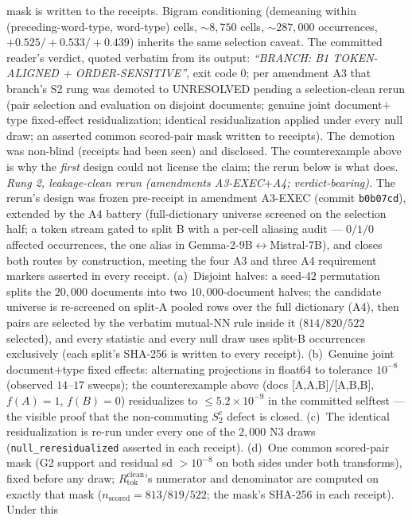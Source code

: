 mask is written to the receipts. Bigram conditioning (demeaning within
(preceding-word-type, word-type) cells, ${\sim}8{,}750$ cells, ${\sim}287{,}000$
occurrences, $+0.525/+0.533/+0.439$) inherits the same selection caveat. The committed
reader's verdict, quoted verbatim from its output: \emph{``BRANCH: B1 TOKEN-ALIGNED +
ORDER-SENSITIVE''}, exit code $0$; per amendment A3 that branch's S2 rung was demoted to
UNRESOLVED pending a selection-clean rerun (pair selection and evaluation on disjoint
documents; genuine joint document$+$type fixed-effect residualization; identical
residualization applied under every null draw; an asserted common scored-pair mask
written to receipts). The demotion was non-blind (receipts had been seen) and disclosed.
The counterexample above is why the \emph{first} design could not license the claim; the
rerun below is what does.
\emph{Rung 2, leakage-clean rerun (amendments A3-EXEC$+$A4; verdict-bearing).} The
rerun's design was frozen pre-receipt in amendment A3-EXEC (commit \texttt{b0b07cd}),
extended by the A4 battery (full-dictionary universe screened on the selection half; a
token stream gated to split B with a per-cell aliasing audit --- $0/1/0$ affected
occurrences, the one alias in Gemma-2-9B$\leftrightarrow$Mistral-7B), and closes
both routes by construction, meeting the four A3 and three A4 requirement markers
asserted in every receipt. (a)~Disjoint halves: a
seed-$42$ permutation splits the $20{,}000$ documents into two $10{,}000$-document
halves; the candidate universe is re-screened on split-A pooled rows over the full
dictionary (A4), then pairs are selected by the verbatim mutual-NN rule inside it
($814/820/522$ selected), and every statistic
and every null draw uses split-B occurrences exclusively (each split's SHA-256 is written
to every receipt). (b)~Genuine joint document$+$type fixed effects: alternating
projections in float64 to tolerance $10^{-8}$ (observed $14$--$17$ sweeps); the
counterexample above (docs [A,A,B]/[A,B,B], $f(A){=}1$, $f(B){=}0$) residualizes to
$\le5.2\times10^{-9}$ in the committed selftest --- the visible proof that the
non-commuting $S_2^{c}$ defect is closed. (c)~The identical residualization is re-run
under every one of the $2{,}000$ N3 draws (\texttt{null\_reresidualized} asserted in each
receipt). (d)~One common scored-pair mask (G2 support and residual sd $>10^{-8}$ on both
sides under both transforms), fixed before any draw; $R_{\text{tok}}^{\text{clean}}$'s
numerator and denominator are computed on exactly that mask
($n_{\text{scored}}{=}813/819/522$; the mask's SHA-256 in each receipt). Under this
